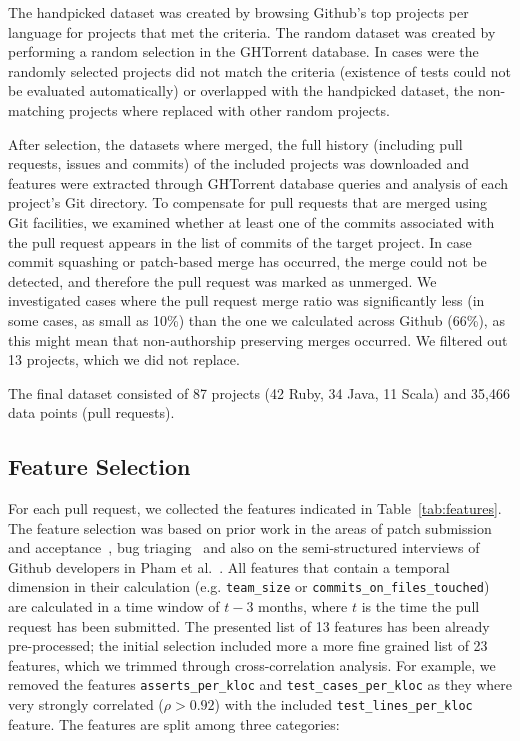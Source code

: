 \documentclass{sig-alternate}
\begin{document}
The \textsf{handpicked} dataset was created by browsing Github's top projects
per language for projects that met the criteria. The \textsf{random} dataset
was created by performing a random selection in the GHTorrent database. In
cases were the randomly selected projects did not match the criteria (existence
of tests could not be evaluated automatically) or overlapped with the
\textsf{handpicked} dataset, the non-matching projects where replaced with
other random projects. 

After selection, the datasets where merged, the full history (including pull
requests, issues and commits) of the included projects was downloaded and
features were extracted through GHTorrent database queries and analysis of each
project's Git directory. To compensate for pull requests that are merged using
Git facilities, we examined whether at least one of the commits associated with
the pull request appears in the list of commits of the target project. In case
commit squashing or patch-based merge has occurred, the merge could not be
detected, and therefore the pull request was marked as unmerged. We
investigated cases where the pull request merge ratio was significantly less
(in some cases, as small as 10\%) than the one we calculated across Github
(66\%), as this might mean that non-authorship preserving merges occurred. We
filtered out 13 projects, which we did not replace. 

The final dataset consisted of 87 projects (42 Ruby, 34 Java, 11 Scala)
and 35,466 data points (pull requests).

\subsection{Feature Selection}

For each pull request, we collected the features indicated in
Table~\ref{tab:features}.  The feature selection was based on prior work in the
areas of patch submission and
acceptance~\cite{Nagap05,Bird07a,Weiss08,Jeong09}, bug triaging~\cite{} and
also on the semi-structured interviews of Github developers in Pham et
al.~\cite{Pham13}. All features that contain a temporal dimension in their
calculation (e.g.  \texttt{team\_size} or \texttt{commits\_on\_files\_touched})
are calculated in a time window of $t - 3$ months, where $t$ is the time the
pull request has been submitted.  The presented list of 13 features has been
already pre-processed; the initial selection included more a more fine grained
list of 23 features, which we trimmed through cross-correlation analysis. For
example, we removed the features \texttt{asserts\_per\_kloc} and
\texttt{test\_cases\_per\_kloc} as they where very strongly correlated ($\rho >
0.92$) with the included \texttt{test\_lines\_per\_kloc} feature.  The features
are split among three categories:
\end{document}
